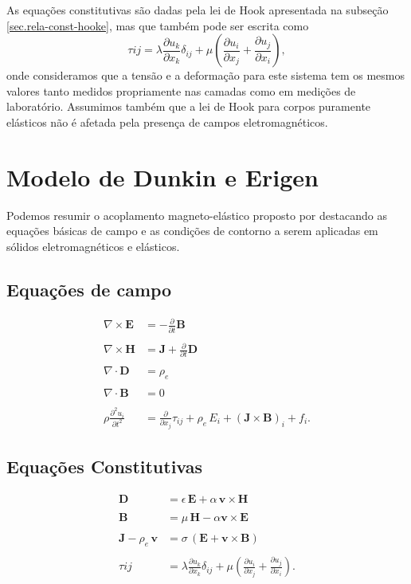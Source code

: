 As equa\c{c}\~oes constitutivas s\~ao dadas pela lei de Hook apresentada na subse\c{c}\~ao \ref{sec.rela-const-hooke}, mas que tamb\'em pode ser escrita como
\begin{equation}
\tau{ij}=\lambda\frac{\partial u_k}{\partial x_k}\delta_{ij}+\mu\left(\frac{\partial u_i}{\partial x_j}+\frac{\partial u_j}{\partial x_i}\right),
\end{equation}
onde consideramos que a tens\~ao e a deforma\c{c}\~ao para  este sistema tem os mesmos valores tanto medidos propriamente nas camadas como em medi\c{c}\~oes de laborat\'orio. Assumimos tamb\'em que a lei de Hook para corpos puramente el\'asticos n\~ao \'e afetada pela presen\c{c}a de campos eletromagn\'eticos. 


\section{Modelo de Dunkin e Erigen}

Podemos resumir o acoplamento magneto-el\'astico proposto por \cite{erigen_1963} destacando as equa\c{c}\~oes b\'asicas de campo e as condi\c{c}\~oes de contorno a serem aplicadas em s\'olidos eletromagn\'eticos e el\'asticos.

\subsection{Equa\c{c}\~oes de campo}

\begin{align*}
\nabla\times\mathbf{E}&=-\frac{\partial}{\partial t}\mathbf{B}\\\\
\nabla\times\mathbf{H}&=\mathbf{J}+\frac{\partial}{\partial t}\mathbf{D}\\\\
\nabla\cdot\mathbf{D}&=\rho_e\\\\
\nabla\cdot\mathbf{B}&=0\\\\
\rho\frac{\partial^2 u_i}{\partial t^2}&=\frac{\partial}{\partial x_j}\tau_{ij}+\rho_e\,E_i+(\mathbf{J}\times\mathbf{B})_i+f_i.
\end{align*}

\subsection{Equa\c{c}\~oes Constitutivas}

\begin{align*}
\mathbf{D}&=\epsilon\,\mathbf{E}+\alpha\,\mathbf{v}\times\mathbf{H}\\\\
\mathbf{B}&=\mu\,\mathbf{H}-\alpha\mathbf{v}\times\mathbf{E}\\\\
\mathbf{J}-\rho_e\,\mathbf{v}&=\sigma\,(\mathbf{E}+\mathbf{v}\times\mathbf{B})\\\\
\tau{ij}&=\lambda\frac{\partial u_k}{\partial x_k}\delta_{ij}+\mu\left(\frac{\partial u_i}{\partial x_j}+\frac{\partial u_j}{\partial x_i}\right).
\end{align*}

